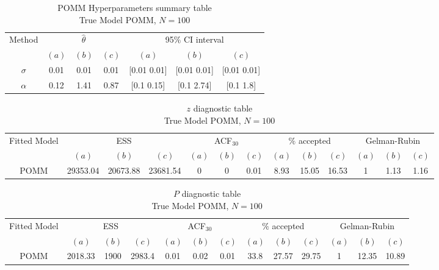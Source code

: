 \documentclass[11pt]{amsart}
\begin{document}
\begin{table}[htbp]
\centering
\caption*{
{\large POMM Hyperparameters summary table} \\ 
{\small True Model POMM, $N=100$}
} 
\begin{tabular}{ccccccc}
\toprule
\multirow{2}{*}{Method} & \multicolumn{3}{c}{
$\hat{\theta}$} & \multicolumn{3}{c}{
95$\%$ CI interval}  \\
\cmidrule(lr){2-4} \cmidrule(lr){5-7} 
& $(a)$ & $(b)$ & $(c)$ & $(a)$ & $(b)$ & $(c)$  \\
\midrule
$\sigma$ &0.01 & 0.01 & 0.01 & [0.01	0.01] & [0.01	0.01] & [0.01	0.01]   \\
$\alpha$ & 0.12 & 1.41 & 0.87 & [0.1	0.15] & [0.1	2.74] & [0.1	1.8] \\
\bottomrule
\end{tabular}
\label{table:simulations_from_simple}
\end{table}








\begin{table}[htbp]
\centering
\caption*{
{\large $z$ diagnostic table} \\ 
{\small True Model POMM, $N=100$}
} 
\begin{tabular}{ccccccccccccc}
\toprule
\multirow{2}{*}{Fitted Model} & \multicolumn{3}{c}{ESS} & \multicolumn{3}{c}{
ACF$_{30}$} & \multicolumn{3}{c}{$\%$ accepted} & \multicolumn{3}{c}{Gelman-Rubin}\\
\cmidrule(lr){2-4} \cmidrule(lr){5-7} \cmidrule(lr){8-10} \cmidrule(lr){11-13} 
& $(a)$ & $(b)$ & $(c)$ & $(a)$ & $(b)$ & $(c)$ & $(a)$ & $(b)$ & $(c)$ & $(a)$ & $(b)$ & $(c)$ \\
\midrule
POMM &29353.04 & 20673.88 & 23681.54 & 0 & 0 & 0.01 & 8.93 & 15.05  & 16.53 & 1 & 1.13 & 1.16    \\
\bottomrule
\end{tabular}
\label{table:simulations_from_simple}
\end{table}

\begin{table}[htbp]
\centering
\caption*{
{\large $P$ diagnostic table} \\ 
{\small True Model POMM, $N=100$}
} 
\begin{tabular}{ccccccccccccc}
\toprule
\multirow{2}{*}{Fitted Model} & \multicolumn{3}{c}{ESS} & \multicolumn{3}{c}{
ACF$_{30}$} & \multicolumn{3}{c}{$\%$ accepted} & \multicolumn{3}{c}{Gelman-Rubin}\\
\cmidrule(lr){2-4} \cmidrule(lr){5-7} \cmidrule(lr){8-10} \cmidrule(lr){11-13} 
& $(a)$ & $(b)$ & $(c)$ & $(a)$ & $(b)$ & $(c)$ & $(a)$ & $(b)$ & $(c)$ & $(a)$ & $(b)$ & $(c)$ \\
\midrule
POMM &2018.33 & 1900 & 2983.4 & 0.01 & 0.02 & 0.01 & 33.8 & 27.57 & 29.75 & 1 & 12.35 & 10.89  \\
\bottomrule
\end{tabular}
\label{table:simulations_from_simple}
\end{table}
\end{document}
